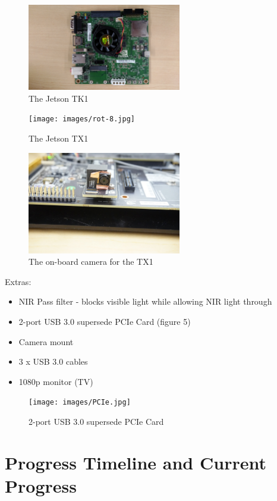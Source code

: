 \documentclass[letterpaper,10pt,titlepage]{IEEEtran}
\begin{document}
 \begin{figure}[!ht]
  \caption{The Jetson TK1}
	  \centering
		    \includegraphics[width=0.6\textwidth,natwidth=610,natheight=642]{images/rot-9.jpg}
				\end{figure}
\begin{figure}[!ht]
  \caption{The Jetson TX1}
	  \centering
		    \texttt{[image: images/rot-8.jpg]}
				\end{figure}
\begin{figure}[!ht]
  \caption{The on-board camera for the TX1}
	  \centering
		    \includegraphics[width=0.6\textwidth,natwidth=610,natheight=642]{images/onboardCamera.JPG}
				\end{figure}
	Extras: 
		\begin{itemize}
		\item NIR Pass filter - blocks visible light while allowing NIR light through
		\item 2-port USB 3.0 supersede PCIe Card (figure 5)
		\item Camera mount
		\item 3 x USB 3.0 cables
		\item 1080p monitor (TV)\\
		\end{itemize}

\begin{figure}[!ht]
  \caption{2-port USB 3.0 supersede PCIe Card}
	  \centering
		    \texttt{[image: images/PCIe.jpg]}
				\end{figure}


\section{Progress Timeline and Current Progress}
\end{document}
